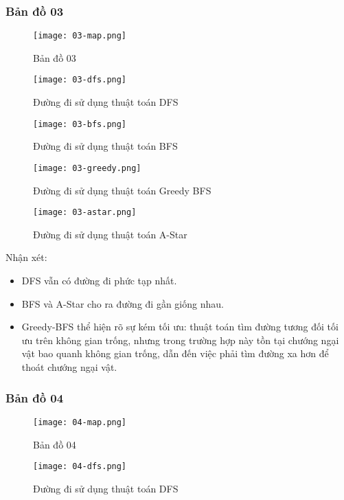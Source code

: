 \documentclass{article}
\begin{document}
\subsubsection{Bản đồ 03}
\begin{figure}[H]
	\centering
	\texttt{[image: 03-map.png]}
	\caption{Bản đồ 03}
\end{figure}

\begin{figure}[H]
	\centering
	\texttt{[image: 03-dfs.png]}
	\caption{Đường đi sử dụng thuật toán DFS}
\end{figure}

\begin{figure}[H]
	\centering
	\texttt{[image: 03-bfs.png]}
	\caption{Đường đi sử dụng thuật toán BFS}
\end{figure}

\begin{figure}[H]
	\centering
	\texttt{[image: 03-greedy.png]}
	\caption{Đường đi sử dụng thuật toán Greedy BFS}
\end{figure}

\begin{figure}[H]
	\centering
	\texttt{[image: 03-astar.png]}
	\caption{Đường đi sử dụng thuật toán A-Star}
\end{figure}

Nhận xét:
\begin{itemize}
\item DFS vẫn có đường đi phức tạp nhất.
\item BFS và A-Star cho ra đường đi gần giống nhau.
\item Greedy-BFS thể hiện rõ sự kém tối ưu: thuật toán tìm đường tương đối tối ưu trên không gian trống, nhưng trong trường hợp này tồn tại chướng ngại vật bao quanh không gian trống, dẫn đến việc phải tìm đường xa hơn để thoát chướng ngại vật.
\end{itemize}

\subsubsection{Bản đồ 04}
\begin{figure}[H]
	\centering
	\texttt{[image: 04-map.png]}
	\caption{Bản đồ 04}
\end{figure}

\begin{figure}[H]
	\centering
	\texttt{[image: 04-dfs.png]}
	\caption{Đường đi sử dụng thuật toán DFS}
\end{figure}
\end{document}
